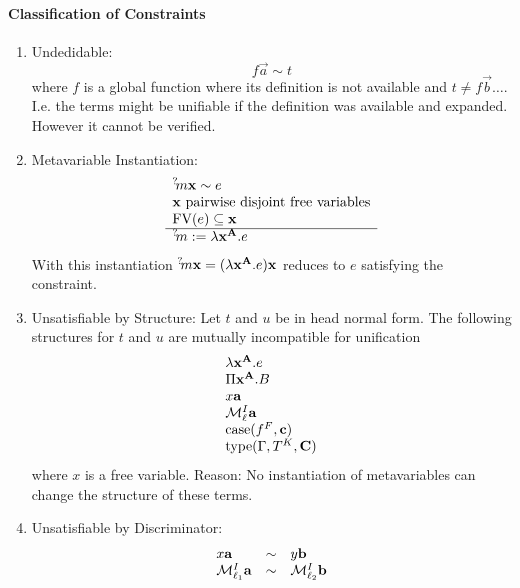 \paragraph{Classification of Constraints}

\begin{enumerate}
    \item Undedidable:
        $$
            f \vec a \sim t
        $$
        where $f$ is a global function where its definition is not available and
        $t \ne f \vec b \ldots$.
        I.e. the terms might be unifiable if the definition
        was available and expanded. However it cannot be verified.

    \item Metavariable Instantiation:
        $$
        \begin{array}{l} 
            {{}^? \kern-0.2em m} {\mathbf x} \sim e
            \\
            {\mathbf x} \text{ pairwise disjoint free variables}
            \\
            {\text{FV}}(e) \subseteq {\mathbf x}
         \\ \hline 
            {{}^? \kern-0.2em m} := \lambda {{\mathbf x}^{{\mathbf A}}}. e
         \end{array}
        $$
        With this instantiation ${{}^? \kern-0.2em m} {\mathbf x} = (\lambda {{\mathbf x}^{{\mathbf A}}} .e) {\mathbf x}$ reduces to $e$ satisfying the constraint.

    \item Unsatisfiable by Structure: Let $t$ and $u$ be in head normal form.
        The following structures for $t$ and $u$ are mutually incompatible for
        unification
        $$
        \begin{array}{l}
            \lambda {{\mathbf x}^{{\mathbf A}}}. e
            \\
            \Pi {{\mathbf x}^{{\mathbf A}}}. B
            \\
            x {\mathbf a}
            \\
            {\cal M}^I_\ell {\mathbf a}
            \\
            {\text{case}}(f^F , {\mathbf c})
            \\
            {\text{type}}(\Gamma , T^K , {\mathbf C})
        \end{array}
        $$
        where $x$ is a free variable. Reason: No instantiation of metavariables
        can change the structure of these terms.

    \item Unsatisfiable by Discriminator:
        $$
        \begin{array}{lll}
            x {\mathbf a} &\sim& y {\mathbf b}
            \\
            {\cal M}^I_{\ell_1} {\mathbf a} &\sim& {\cal M}^I_{\ell_2} {\mathbf b}
        \end{array}
        $$
\end{enumerate}








